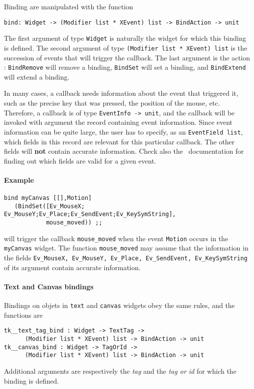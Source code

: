 Binding are manipulated with the function
\begin{verbatim}
bind: Widget -> (Modifier list * XEvent) list -> BindAction -> unit
\end{verbatim} 

The first argument of type \verb|Widget| is naturally the widget for which
this binding is defined.
The second argument of type \verb|(Modifier list * XEvent) list| is the 
succession of events that will trigger the callback.
The last argument is the action : \verb|BindRemove| will remove a binding,
\verb|BindSet| will set a binding, and \verb|BindExtend| will extend a
binding.

In many cases, a callback needs information about the event that
triggered it, such as the precise key that was pressed, the position of the
mouse, etc. Therefore, a callback is of type \verb|EventInfo -> unit|, 
and the callback will be invoked with argument the record containing
event information. Since event information can be quite large,
the user has to specify, as an \verb|EventField list|, which fields in this
record are relevant for this particular callback. 
The other fields will {\bf not} contain accurate information. 
Check also the \tk\ documentation for finding out which fields are valid for a
given event.

\paragraph{Example}
\begin{verbatim}
bind myCanvas [[],Motion] 
   (BindSet([Ev_MouseX; Ev_MouseY;Ev_Place;Ev_SendEvent;Ev_KeySymString], 
            mouse_moved)) ;;
\end{verbatim} 
will trigger the callback \verb|mouse_moved| when the event \verb|Motion|
occurs in the \verb|myCanvas| widget. The function \verb|mouse_moved| may
assume that the  information in the fields {\tt Ev\_MouseX, Ev\_MouseY,
Ev\_Place, Ev\_SendEvent, Ev\_KeySymString} of its argument contain accurate
information.

\paragraph{Text and Canvas bindings}
\mbox{}\newline

Bindings on objets in \verb|text| and \verb|canvas| widgets obey the same
rules, and the functions are 
\begin{verbatim}
tk__text_tag_bind : Widget -> TextTag -> 
      (Modifier list * XEvent) list -> BindAction -> unit
tk__canvas_bind : Widget -> TagOrId -> 
      (Modifier list * XEvent) list -> BindAction -> unit
\end{verbatim} 
Additional arguments are respectively the {\em tag} and the {\em tag or id}
for which the binding is defined.

